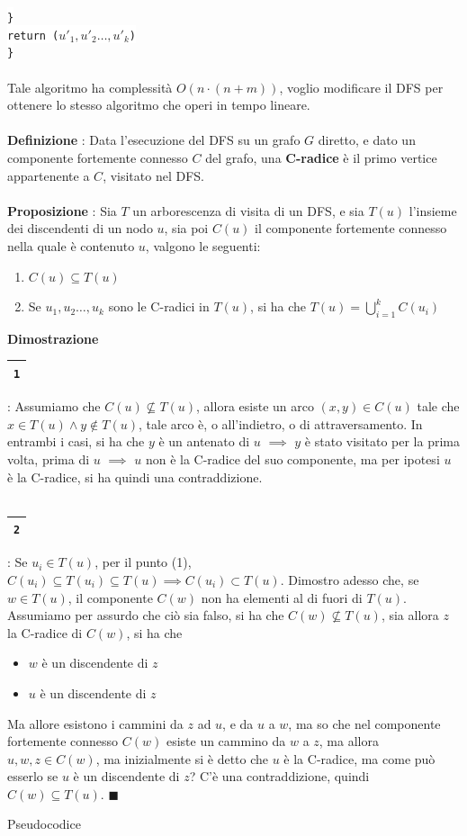 \documentclass[12pt, letterpaper]{article}
\newcommand{\codee}[1]{\colorbox{white}{\texttt{#1}}}
\newcommand{\acc}{\\\hphantom{}\\}
\newcommand{\boxedMath}[1]{\begin{tabular}{|c|}\hline \texttt{#1} \\ \hline\end{tabular} :}
\begin{document}
\hphantom{ident}\codee{\}}\\
\hphantom{ident}\codee{return ($u'_1,u'_2\dots,u'_k$)}\\
\codee{\}}\acc
Tale algoritmo ha complessità $O(n\cdot(n+m))$, voglio modificare il DFS per ottenere lo stesso algoritmo che operi in
tempo lineare.\acc
\textbf{Definizione} : Data l'esecuzione del DFS su un grafo $G$ diretto, e dato un componente fortemente
connesso $C$ del grafo, una \textbf{C-radice} è il primo vertice appartenente a $C$, visitato nel DFS.\acc
\textbf{Proposizione} : Sia $T$ un arborescenza di visita di un DFS, e sia $T(u)$ l'insieme dei discendenti di un nodo
$u$, sia poi $C(u)$ il componente fortemente connesso nella quale è contenuto $u$, valgono le seguenti:\begin{enumerate}
    \item $C(u)\subseteq T(u)$
    \item Se $u_1,u_2\dots,u_k$ sono le C-radici in $T(u)$, si ha che $\displaystyle T(u)=\bigcup_{i=1}^k C(u_i)$
\end{enumerate}
\textbf{Dimostrazione} \boxedMath{1} Assumiamo che $C(u)\nsubseteq  T(u)$, allora esiste un arco $(x,y)\in C(u)$ tale
che $x\in T(u)\land y\notin T(u)$, tale arco è, o all'indietro, o di attraversamento. In entrambi i casi, si ha che
$y$ è un antenato di $u$ $\implies$ $y$ è stato visitato per la prima volta, prima di $u$ $\implies$ $u$ non è la
C-radice del suo componente, ma per ipotesi $u$ è la C-radice, si ha quindi una contraddizione.\acc
\boxedMath{2} Se $u_i\in T(u)$, per il punto (1), $C(u_i)\subseteq T(u_i) \subseteq T(u)\implies C(u_i)\subset T(u)$. Dimostro
adesso che,
se $w\in T(u)$, il componente $C(w)$ non ha elementi al di fuori di $T(u)$. Assumiamo per assurdo che ciò sia falso, si ha
che $C(w)\nsubseteq T(u)$, sia allora $z$ la C-radice di $C(w)$, si ha che  \begin{itemize}
    \item $w$ è un discendente di $z$
    \item $u$ è un discendente di $z$
\end{itemize}
Ma allore esistono i cammini da $z$ ad $u$, e da $u$ a $w$, ma so che nel componente fortemente connesso $C(w)$ esiste
un cammino da $w$ a $z$, ma allora $u,w,z\in C(w)$, ma inizialmente si è detto che $u$ è la C-radice, ma come può esserlo se
$u$ è un discendente di $z$? C'è una contraddizione, quindi $C(w)\subseteq T(u)$. $\blacksquare$
\begin{center}
    Pseudocodice
\end{center}
\end{document}
